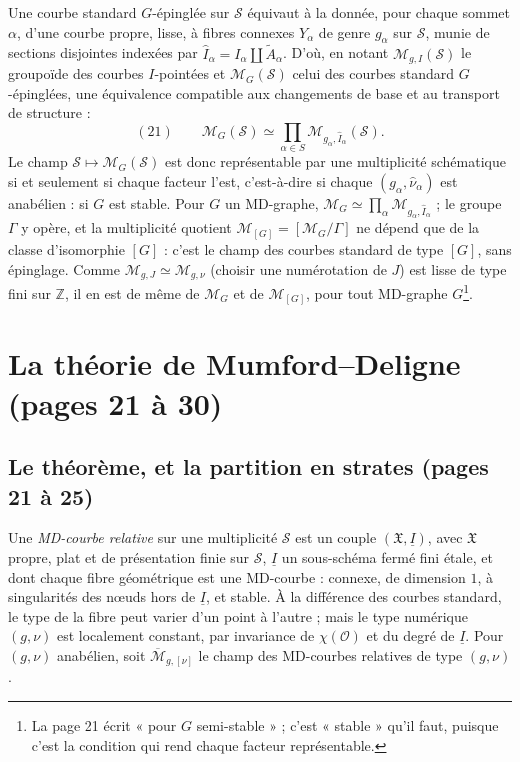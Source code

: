 \documentclass[11pt,a4paper]{article}
\begin{document}
Une courbe standard $G$-épinglée sur $\mathcal{S}$ équivaut à la donnée, pour
chaque sommet $\alpha$, d'une courbe propre, lisse, à fibres connexes $Y_\alpha$
de genre $g_\alpha$ sur $\mathcal{S}$, munie de sections disjointes indexées par
$\widehat{I}_\alpha = I_\alpha \amalg \widetilde{A}_\alpha$. D'où, en notant
$\mathcal{M}_{g,I}(\mathcal{S})$ le groupoïde des courbes $I$-pointées et
$\mathcal{M}_G(\mathcal{S})$ celui des courbes standard $G$-épinglées, une
équivalence compatible aux changements de base et au transport de structure :
\[
(21) \qquad \mathcal{M}_G(\mathcal{S}) \simeq \prod_{\alpha \in S}
\mathcal{M}_{g_\alpha, \widehat{I}_\alpha}(\mathcal{S}) .
\]
Le champ $\mathcal{S} \mapsto \mathcal{M}_G(\mathcal{S})$ est donc représentable
par une multiplicité schématique si et seulement si chaque facteur l'est,
c'est-à-dire si chaque $(g_\alpha, \widehat{\nu}_\alpha)$ est anabélien : si $G$
est stable. Pour $G$ un MD-graphe, $\mathcal{M}_G \simeq \prod_\alpha
\mathcal{M}_{g_\alpha, \widehat{I}_\alpha}$ ; le groupe $\Gamma$ y opère, et la
multiplicité quotient $\mathcal{M}_{[G]} = [\mathcal{M}_G/\Gamma]$ ne dépend que
de la classe d'isomorphie $[G]$ : c'est le champ des courbes standard de type
$[G]$, sans épinglage. Comme $\mathcal{M}_{g,J} \simeq \mathcal{M}_{g,\nu}$
(choisir une numérotation de $J$) est lisse de type fini sur $\mathbb{Z}$, il en
est de même de $\mathcal{M}_G$ et de $\mathcal{M}_{[G]}$, pour tout MD-graphe
$G$\footnote{La page 21 écrit « pour $G$ semi-stable » ; c'est « stable » qu'il
faut, puisque c'est la condition qui rend chaque facteur représentable.}.

\section*{La théorie de Mumford--Deligne (pages 21 à 30)}

\subsection*{Le théorème, et la partition en strates (pages 21 à 25)}

Une \emph{MD-courbe relative} sur une multiplicité $\mathcal{S}$ est un couple
$(\mathfrak{X}, \underline{I})$, avec $\mathfrak{X}$ propre, plat et de
présentation finie sur $\mathcal{S}$, $\underline{I}$ un sous-schéma fermé fini
étale, et dont chaque fibre géométrique est une MD-courbe : connexe, de dimension
$1$, à singularités des nœuds hors de $\underline{I}$, et stable. À la
différence des courbes standard, le type de la fibre peut varier d'un point à
l'autre ; mais le type numérique $(g, \nu)$ est localement constant, par
invariance de $\chi(\mathcal{O})$ et du degré de $\underline{I}$. Pour $(g, \nu)$
anabélien, soit $\overline{\mathcal{M}}_{g,[\nu]}$ le champ des MD-courbes
relatives de type $(g, \nu)$.
\end{document}
